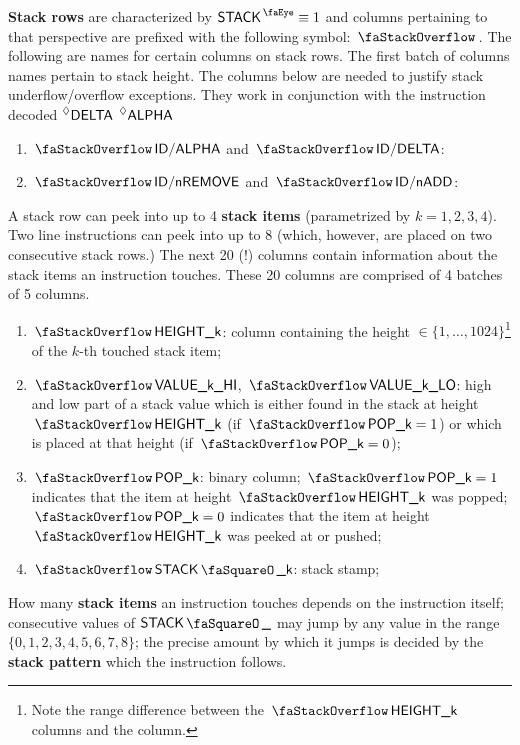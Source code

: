 \begin{center}
\end{center}
\textbf{Stack rows}\label{def: stack row} are characterized by $\peekStack \equiv 1$ and columns pertaining to that perspective are prefixed with the following symbol: $\stackSignifier$.
The following are names for certain columns on stack rows. The first batch of columns names pertain to stack height.
The columns below are needed to justify stack underflow/overflow exceptions. They work in conjunction with the instruction decoded $\prescript{\lozenge}{}{\textsf{DELTA}}$ $\prescript{\lozenge}{}{\textsf{ALPHA}}$
\begin{enumerate}[resume]
	\item $\stackAlpha$    and $\stackDelta$:
	\item $\stackNbRemove$ and $\stackNbAdd$:
\end{enumerate}
A stack row can peek into up to 4 \textbf{stack items} (parametrized by $k=1,2,3,4$). Two line instructions can peek into up to 8 (which, however, are placed on two consecutive stack rows.)
The next 20 (!) columns contain information about the stack items an instruction touches.
These 20 columns are comprised of 4 batches  of 5 columns.
\begin{enumerate}[resume]
	\item $\stackItemHeight{k}$:
		column containing the height $\in\{1,\dots,1024\}$\footnote{Note the range difference between the $\stackItemHeight{k}$ columns and the \stackHeight{} column.} of the $k$-th touched stack item;
	\item $\stackItemValHi{k}$, $\stackItemValLo{k}$:
		high and low part of a stack value which is either found in the stack at height $\stackItemHeight{k}$ (if $\stackItemPop{k} = 1$) or which is placed at that height (if $\stackItemPop{k} = 0$);
	\item $\stackItemPop{k}$:
		binary column; $\stackItemPop{k} = 1$ indicates that the item at height $\stackItemHeight{k}$ was popped; $\stackItemPop{k} = 0$ indicates that the item at height $\stackItemHeight{k}$ was peeked at or pushed; 
	\item $\stackItemStamp{k}$:
		stack stamp;
\end{enumerate}
How many \textbf{stack items} an instruction touches depends on the instruction itself; consecutive values of $\sStamp{}$ may jump by any value in the range $\{0,1,2,3,4,5,6,7,8\}$; the precise amount by which it jumps is decided by the \textbf{stack pattern} which the instruction follows.
